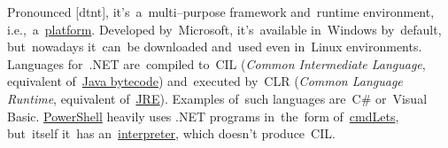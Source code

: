 \label{dotnet}
Pronounced [d\textopeno{}tn\textepsilon{}t], it's~a~multi--purpose framework and~runtime environment, i.e.,~a~\hyperref[platform]{platform}.
Developed by~Microsoft, it's~available in~Windows by~default, but~nowadays it~can~be downloaded and~used even in~Linux environments.
Languages \mbox{for~.NET} are~compiled to~CIL (\textit{Common Intermediate Language}, equivalent of~\hyperref[javabytecode]{Java bytecode}) and~executed by~CLR (\textit{Common Language Runtime}, equivalent of~\hyperref[jdkjrejvm]{JRE}).
Examples of~such languages are~C\# or~Visual Basic.
\hyperref[powershell]{PowerShell} heavily uses .NET programs in~the~form of~\hyperref[powershellcmdlet]{cmdLets}, but~itself it~has an~\hyperref[compiledinterpretedlanguages]{interpreter}, which doesn't produce~CIL\@.
